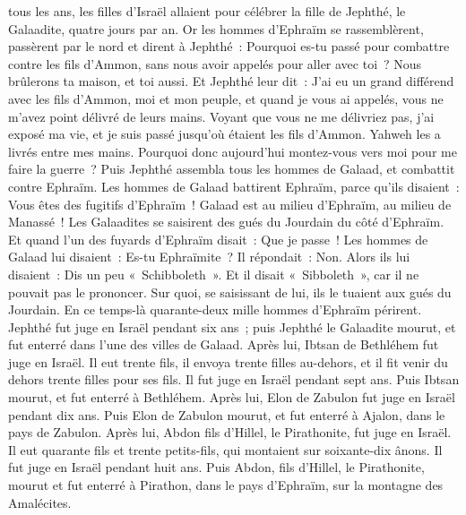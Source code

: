 \begin{multicols}{2}
tous les ans, les filles d'Israël allaient pour célébrer la fille de Jephthé, le Galaadite, quatre jours par an.
\VerseOne{}Or les hommes d'Ephraïm se rassemblèrent, passèrent par le nord et dirent à Jephthé~: Pourquoi es-tu passé pour combattre contre les fils d'Ammon, sans nous avoir appelés pour aller avec toi~? Nous brûlerons ta maison, et toi aussi.
Et Jephthé leur dit~: J'ai eu un grand différend avec les fils d'Ammon, moi et mon peuple, et quand je vous ai appelés, vous ne m'avez point délivré de leurs mains.
Voyant que vous ne me délivriez pas, j'ai exposé ma vie, et je suis passé jusqu'où étaient les fils d'Ammon. Yahweh les a livrés entre mes mains. Pourquoi donc aujourd'hui montez-vous vers moi pour me faire la guerre~?
Puis Jephthé assembla tous les hommes de Galaad, et combattit contre Ephraïm. Les hommes de Galaad battirent Ephraïm, parce qu'ils disaient~: Vous êtes des fugitifs d'Ephraïm~! Galaad est au milieu d'Ephraïm, au milieu de Manassé~!
Les Galaadites se saisirent des gués du Jourdain du côté d'Ephraïm. Et quand l'un des fuyards d'Ephraïm disait~: Que je passe~! Les hommes de Galaad lui disaient~: Es-tu Ephraïmite~? Il répondait~: Non.
Alors ils lui disaient~: Dis un peu «~Schibboleth~». Et il disait «~Sibboleth~», car il ne pouvait pas le prononcer. Sur quoi, se saisissant de lui, ils le tuaient aux gués du Jourdain. En ce temps-là quarante-deux mille hommes d'Ephraïm périrent.
Jephthé fut juge en Israël pendant six ans~; puis Jephthé le Galaadite mourut, et fut enterré dans l'une des villes de Galaad.
Après lui, Ibtsan de Bethléhem fut juge en Israël.
Il eut trente fils, il envoya trente filles au-dehors, et il fit venir du dehors trente filles pour ses fils. Il fut juge en Israël pendant sept ans.
Puis Ibtsan mourut, et fut enterré à Bethléhem.
Après lui, Elon de Zabulon fut juge en Israël pendant dix ans.
Puis Elon de Zabulon mourut, et fut enterré à Ajalon, dans le pays de Zabulon.
Après lui, Abdon fils d'Hillel, le Pirathonite, fut juge en Israël.
Il eut quarante fils et trente petits-fils, qui montaient sur soixante-dix ânons. Il fut juge en Israël pendant huit ans.
Puis Abdon, fils d'Hillel, le Pirathonite, mourut et fut enterré à Pirathon, dans le pays d'Ephraïm, sur la montagne des Amalécites.

\end{multicols}
